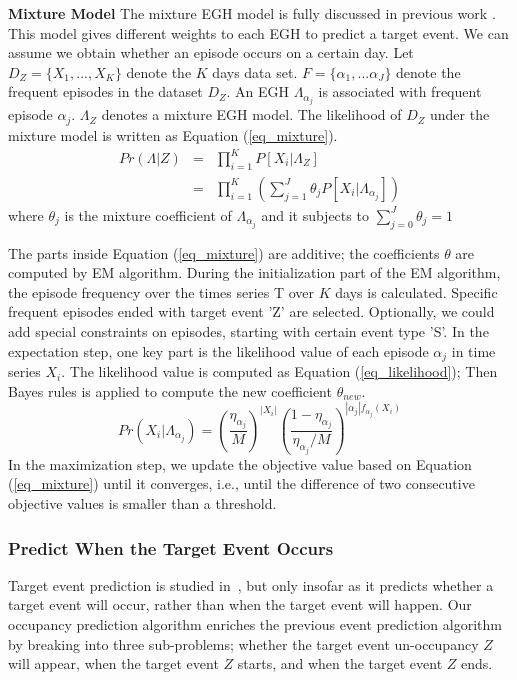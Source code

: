 \textbf{Mixture Model}
The mixture EGH model is fully discussed in previous work \cite{laxman2008stream}.
This model 
gives different weights to each EGH
to predict a target event. 
We can assume we obtain whether an episode occurs on a certain day. 
Let $D_Z=\{X_1,..., X_K\}$ denote the $K$ days data set. 
$F=\{\alpha_1, ... \alpha_J\}$ denote the frequent episodes in the dataset $D_Z$. 
An EGH $\Lambda_{\alpha_j}$ 
is associated with frequent episode $\alpha_j$.
$\Lambda_Z$ denotes a mixture EGH model. 
The likelihood of $D_Z$ under the mixture model is written as Equation (\ref{eq_mixture}).
\begin{eqnarray}
\label{eq_mixture}
Pr(\Lambda|Z) &=& \prod_{i=1}^K P[X_i|\Lambda_Z] \\
			&=& \prod_{i=1}^K ( \sum_{j=1}^J \theta_j P[X_i| \Lambda_{\alpha_j}])
\end{eqnarray}
where $\theta_j$ is the mixture coefficient of $\Lambda_{\alpha_j}$ and it subjects to 
$\sum_{j=0}^J \theta_j=1$ 

The parts inside Equation (\ref{eq_mixture}) are additive; 
the coefficients $\theta$ are computed by EM algorithm. 
%
During the initialization %
part of the EM algorithm, 
the episode frequency over the times series T over $K$ days is calculated. 
Specific frequent episodes ended with target event 'Z' are selected. 
Optionally, 
we could add special constraints on episodes, starting with 
certain event type 'S'. 
In the expectation step, 
one key part is the likelihood value of each episode $\alpha_j$ in time series $X_i$.
The likelihood value is computed as Equation (\ref{eq_likelihood});
Then Bayes rules is applied to compute the new coefficient $\theta_{new}$. 
\begin{equation}
\label{eq_likelihood}
Pr(X_i| \Lambda_{\alpha_j}) = (\frac{\eta_{\alpha_j}}{M})^{|X_i|} (\frac{1-\eta_{\alpha_j}}{\eta_{\alpha_j}/M})^{|\alpha_j|f_{\alpha_j}(X_i)}
\end{equation}
In the maximization step, 
we update the objective value based on Equation (\ref{eq_mixture}) until it converges, i.e., 
until the difference of two consecutive objective values 
is smaller than a threshold.%


\subsubsection{Predict When the Target Event Occurs}
Target event prediction is studied in~\cite{laxman2008stream},  
but only insofar as it predicts whether a target event will occur, 
rather than when the target event will happen. 
Our occupancy prediction algorithm enriches the previous 
event prediction algorithm by breaking into three sub-problems; whether the target event un-occupancy $Z$ will appear, when the target event $Z$ starts, and when the target event $Z$ ends. 

